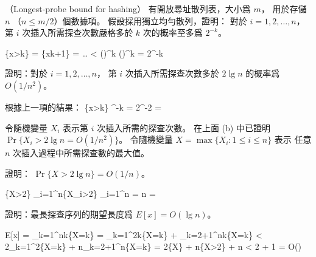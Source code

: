 \startPROBLEM
（Longest-probe bound for hashing）
有開放尋址散列表，大小爲 $m$，
用於存儲 $n$ （$n\le m/2$）個數據項。
\startigBase[a]\startitem
假設採用獨立均勻散列，證明：
對於 $i=1,2,\ldots,n$，
第 $i$ 次插入所需探查次數嚴格多於 $k$ 次的概率至多爲 $2^{-k}$。
\stopitem\stopigBase

\startANSWER
\startsplitformula\startmathalignment
\NC \Pr\{x>k\}
    \NC = \Pr\{x\ge k+1\} \NR
\NC \NC =  \cdot {}
          \cdot \ldots \cdot
	    \NR
\NC \NC < ()^k \NR
\NC \NC \le ()^k \NR
\NC \NC = 2^{-k} \NR
\stopmathalignment\stopsplitformula
\stopANSWER

\startigBase[continue]\startitem
證明：對於 $i=1,2,\ldots,n$，
第 $i$ 次插入所需探查次數多於 $2\lg{n}$ 的概率爲 $O(1/n^2)$。
\stopitem\stopigBase

\startANSWER
根據上一項的結果：
\startformula
\Pr\{x>k\} ^{-k} = 2^{-2} = 
\stopformula
\stopANSWER

令隨機變量 $X_i$ 表示第 $i$ 次插入所需的探查次數。
在上面 (b) 中已證明 $\Pr\{X_i>2\lg{n} = O(1/n^2)\}$。
令隨機變量 $X=\max\{X_i: 1\le i\le n\}$ 表示
任意 $n$ 次插入過程中所需探查數的最大值。

\startigBase[continue]\startitem
證明： $\Pr\{X>2\lg{n}\} = O(1/n)$。
\stopitem\stopigBase

\startANSWER
\startformula
\Pr\{X>2\}
  \le \sum_{i=1}^{n}\Pr\{X_i>2\}
  \le \sum_{i=1}^{n}
  = n \cdot {}
  = 
\stopformula
\stopANSWER

\startigBase[continue]\startitem
證明：最長探查序列的期望長度爲 $E[x]=O(\lg{n})$。
\stopitem\stopigBase

\startANSWER
\startsplitformula\startmathalignment
\NC E[x]
    \NC = \sum_{k=1}^{n}k\Pr\{X=k\} \NR
\NC \NC = \sum_{k=1}^{2}k\Pr\{X=k\} + \sum_{k=2+1}^{n}k\Pr\{X=k\} \NR
\NC \NC < 2\sum_{k=1}^{2}\Pr\{X=k\} + n\sum_{k=2+1}^{n}\Pr\{X=k\} \NR
\NC \NC = 2\Pr\{X\} + n\Pr\{X>2\} \NR
{}
\NC \NC {} + n \cdot {} \NR
\NC \NC < 2 + 1 \NR
\NC \NC = O() \NR
\stopmathalignment\stopsplitformula
\stopANSWER

\stopPROBLEM
